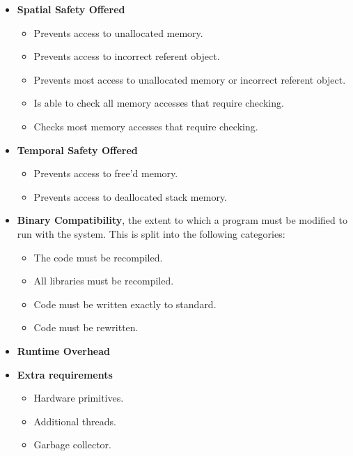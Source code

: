 \begin{itemize}
    \item \textbf{Spatial Safety Offered}
    \begin{itemize}
        \item Prevents access to unallocated memory.
        \item Prevents access to incorrect referent object.
        \item Prevents most access to unallocated memory or incorrect referent object.
        \item Is able to check all memory accesses that require checking.
        \item Checks most memory accesses that require checking.
    \end{itemize}
    \item \textbf{Temporal Safety Offered}
    \begin{itemize}
        \item Prevents access to free'd memory.
        \item Prevents access to deallocated stack memory.
    \end{itemize}
    \item \textbf{Binary Compatibility}, the extent to which a program must be modified to run with the system. This is split into the following categories:
    \begin{itemize}
        \item The code must be recompiled.
        \item All libraries must be recompiled.
        \item Code must be written exactly to standard.
        \item Code must be rewritten.
    \end{itemize}
    \item \textbf{Runtime Overhead}
    \item \textbf{Extra requirements}
    \begin{itemize}
        \item Hardware primitives.
        \item Additional threads.
        \item Garbage collector.
    \end{itemize}
\end{itemize}

\newcommand*\rot{\rotatebox{90}}
\newcommand{\xmark}{\ding{55}}

